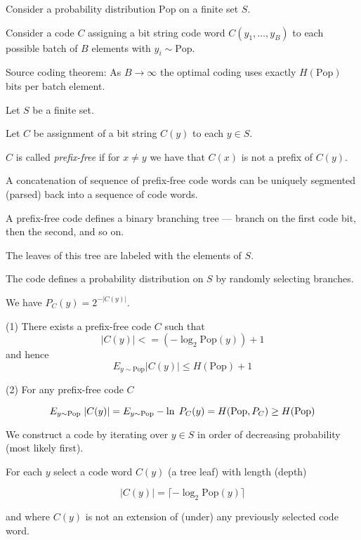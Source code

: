 Consider a probability distribution $\mathrm{Pop}$ on a finite set $S$.

\vfill
Consider a code $C$ assigning a bit string code word $C(y_1,\ldots,y_B)$ to each possible batch of $B$ elements with $y_i \sim \mathrm{Pop}$.

\vfill
Source coding theorem: As $B \rightarrow \infty$ the optimal coding uses exactly $H(\mathrm{Pop})$
bits per batch element.


Let $S$ be a finite set.

\vfill
Let $C$ be assignment of a bit string $C(y)$ to each $y \in S$.

\vfill
$C$ is called {\em prefix-free} if for $x \not = y$ we have that $C(x)$ is not a prefix of $C(y)$.

\vfill
A concatenation of sequence of prefix-free code words can be uniquely segmented (parsed) back into a sequence of code words.


A prefix-free code defines a binary branching tree --- branch on the first code bit, then the second, and so on.

\vfill
The leaves of this tree are labeled with the elements of $S$.

\vfill
The code defines a probability distribution on $S$ by randomly selecting branches.

\vfill
We have $P_C(y) = 2^{-|C(y)|}$.


(1) There exists a prefix-free code $C$ such that
$$|C(y)| <= (- \log_2 \mathrm{Pop}(y)) + 1$$
and hence
$$E_{y\sim \mathrm{Pop}} |C(y)| \leq H(\mathrm{Pop}) +1$$

\vfill
(2) For any prefix-free code $C$

$$E_{y \sim \mathrm{Pop}}\;|C(y)| = E_{y \sim \mathrm{Pop}} -\ln \;P_C(y) = H(\mathrm{Pop},P_C) \geq H(\mathrm{Pop})$$


\vfill
We construct a code by iterating over $y \in S$ in order of decreasing probability (most likely first).

\vfill
For each $y$ select a code word $C(y)$ (a tree leaf) with length (depth)

\vfill
$$|C(y)| = \lceil - \log_2 \mathrm{Pop}(y)\rceil$$

\vfill
and where $C(y)$ is not an extension of (under) any previously selected code word.


